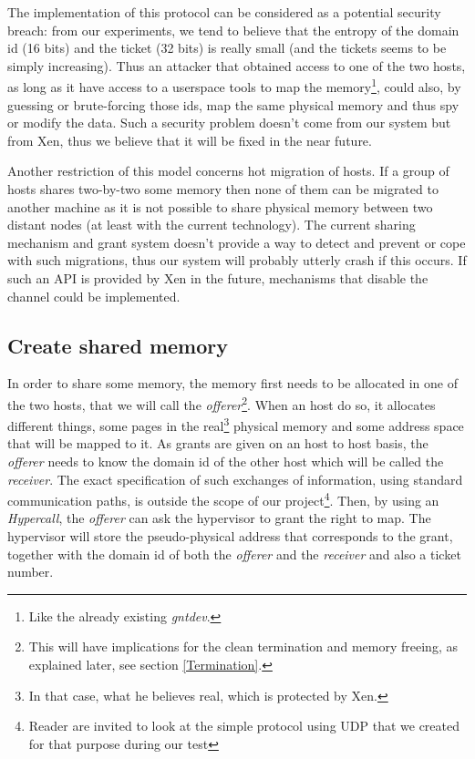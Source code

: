 \documentclass[journal]{IEEEtran}
\begin{document}
The implementation of this protocol can be considered as a potential security breach: from our experiments, we tend to believe that the entropy of the domain id (16 bits) and the ticket (32 bits) is really small (and the tickets seems to be simply increasing). Thus an attacker that obtained access to one of the two hosts, as long as it have access to a userspace tools to map the memory\footnote{Like the already existing \emph{gntdev}.}, could also, by guessing or brute-forcing those ids, map the same physical memory and thus spy or modify the data. Such a security problem doesn't come from our system but from Xen, thus we believe that it will be fixed in the near future.

Another restriction of this model concerns hot migration of hosts. If a group of hosts shares two-by-two some memory then none of them can be migrated to another machine as it is not possible to share physical memory between two distant nodes (at least with the current technology). The current sharing mechanism and grant system doesn't provide a way to detect and prevent or cope with such migrations, thus our system will probably utterly crash if this occurs. If such an API is provided by Xen in the future, mechanisms that disable the channel could be implemented.

\subsection{Create shared memory}

In order to share some memory, the memory first needs to be allocated in one of the two hosts, that we will call the \emph{offerer}\footnote{This will have implications for the clean termination and memory freeing, as explained later, see section \ref{Termination}.}. When an host do so, it allocates different things, some pages in the real\footnote{In that case, what he believes real, which is protected by Xen.} physical memory and some address space that will be mapped to it. As grants are given on an host to host basis, the \emph{offerer} needs to know the domain id of the other host which will be called the \emph{receiver}. The exact specification of such exchanges of information, using standard communication paths, is outside the scope of our project\footnote{Reader are invited to look at the simple protocol using UDP that we created for that purpose during our test}. Then, by using an \emph{Hypercall}, the \emph{offerer} can ask the hypervisor to grant the right to map. The hypervisor will store the pseudo-physical address that corresponds to the grant, together with the domain id of both the \emph{offerer} and the \emph{receiver} and also a ticket number.
\end{document}
